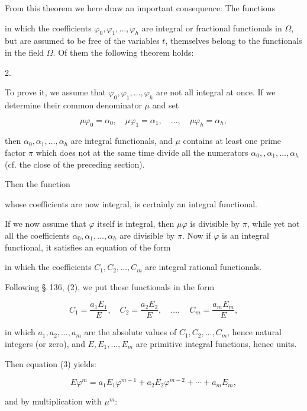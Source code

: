 
From this theorem we here draw an important consequence: The functions


in which the coefficients $\varphi_0, \varphi_1, \ldots, \varphi_h$ are integral or fractional functionals in $\Omega$, but are assumed to be free of the variables $t$, themselves belong to the functionals in the field $\Omega$. Of them the following theorem holds:

2. 

To prove it, we assume that $\varphi_0, \varphi_1, \ldots, \varphi_h$ are not all integral at once. If we determine their common denominator $\mu$ and set

\[
\mu\varphi_0 = \alpha_0, \quad \mu\varphi_1 = \alpha_1, \quad \ldots, \quad \mu\varphi_h = \alpha_h,
\]

then $\alpha_0, \alpha_1, \ldots, \alpha_h$ are integral functionals, and $\mu$ contains at least one prime factor $\pi$ which does not at the same time divide all the numerators $\alpha_0,, \alpha_1, \ldots, \alpha_h$ %
(cf. the close of the preceding section).

Then the function


whose coefficients are now integral, is certainly an integral functional.

If we now assume that $\varphi$ itself is integral, then $\mu\varphi$ is divisible by $\pi$, while yet not all the coefficients $\alpha_0, \alpha_1, \ldots, \alpha_h$ are divisible by $\pi$. Now if $\varphi$ is an integral functional, it satisfies an equation of the form


in which the coefficients $C_1, C_2, \ldots, C_m$ are integral rational functionals.

Following \S.\,136, (2), we put these functionals in the form

\[
C_1 = \frac{a_1 E_1}{E}, \quad C_2 = \frac{a_2 E_2}{E}, \quad \ldots, \quad C_m = \frac{a_m E_m}{E},
\]

in which $a_1, a_2, \ldots, a_m$ are the absolute values of $C_1, C_2, \ldots, C_m$, hence natural integers (or zero), and $E, E_1, \ldots, E_m$ are primitive integral functions, hence units.

Then equation (3) yields:

\[
E\varphi^m = a_1 E_1 \varphi^{m-1} + a_2 E_2 \varphi^{m-2} + \cdots + a_m E_m,
\]

and by multiplication with $\mu^m$:

